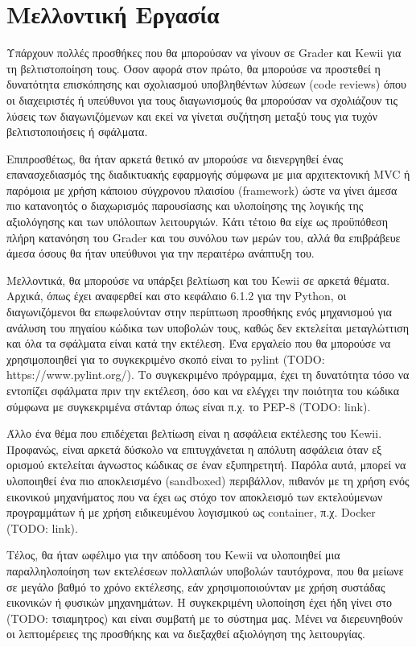 \documentclass[diploma]{softlab-thesis}
\begin{document}
\section{Μελλοντική Εργασία}

Υπάρχουν πολλές προσθήκες που θα μπορούσαν να γίνουν σε Grader και Kewii για τη
βελτιστοποίηση τους. Όσον αφορά στον πρώτο, θα μπορούσε να προστεθεί η δυνατότητα
επισκόπησης και σχολιασμού υποβληθέντων λύσεων (code reviews) όπου οι διαχειριστές
ή υπεύθυνοι για τους διαγωνισμούς θα μπορούσαν να σχολιάζουν τις λύσεις των
διαγωνιζόμενων και εκεί να γίνεται συζήτηση μεταξύ τους για τυχόν βελτιστοποιήσεις
ή σφάλματα.

\bigskip

Επιπροσθέτως, θα ήταν αρκετά θετικό αν μπορούσε να διενεργηθεί ένας επανασχεδιασμός
της διαδικτυακής εφαρμογής σύμφωνα με μια αρχιτεκτονική MVC ή παρόμοια με χρήση
κάποιου σύγχρονου πλαισίου (framework) ώστε να γίνει άμεσα πιο κατανοητός ο
διαχωρισμός παρουσίασης και υλοποίησης της λογικής της αξιολόγησης και των
υπόλοιπων λειτουργιών. Κάτι τέτοιο θα είχε ως προϋπόθεση πλήρη κατανόηση του Grader
και του συνόλου των μερών του, αλλά θα επιβράβευε άμεσα όσους θα ήταν υπεύθυνοι για
την περαιτέρω ανάπτυξη του.

\bigskip

Μελλοντικά, θα μπορούσε να υπάρξει βελτίωση και του Kewii σε αρκετά θέματα.
Αρχικά, όπως έχει αναφερθεί και στο κεφάλαιο 6.1.2 για την Python, οι
διαγωνιζόμενοι θα επωφελούνταν στην περίπτωση προσθήκης ενός μηχανισμού για
ανάλυση του πηγαίου κώδικα των υποβολών τους, καθώς δεν εκτελείται μεταγλώττιση
και όλα τα σφάλματα είναι κατά την εκτέλεση. Ένα εργαλείο που θα μπορούσε να
χρησιμοποιηθεί για το συγκεκριμένο σκοπό είναι το pylint (TODO:
https://www.pylint.org/). Το συγκεκριμένο πρόγραμμα, έχει τη δυνατότητα τόσο να
εντοπίζει σφάλματα πριν την εκτέλεση, όσο και να ελέγχει την ποιότητα του
κώδικα σύμφωνα με συγκεκριμένα στάνταρ όπως είναι π.χ. το PEP-8 (TODO: link).

\bigskip

Άλλο ένα θέμα που επιδέχεται βελτίωση είναι η ασφάλεια εκτέλεσης του Kewii.
Προφανώς, είναι αρκετά δύσκολο να επιτυγχάνεται η απόλυτη ασφάλεια όταν εξ ορισμού
εκτελείται άγνωστος κώδικας σε έναν εξυπηρετητή. Παρόλα αυτά, μπορεί να υλοποιηθεί
ένα πιο αποκλεισμένο (sandboxed) περιβάλλον, πιθανόν με τη χρήση ενός εικονικού
μηχανήματος που να έχει ως στόχο τον αποκλεισμό των εκτελούμενων προγραμμάτων ή
με χρήση ειδικευμένου λογισμικού ως container, π.χ. Docker (TODO: link).

\bigskip

Τέλος, θα ήταν ωφέλιμο για την απόδοση του Kewii να υλοποιηθεί μια παραλληλοποίηση
των εκτελέσεων πολλαπλών υποβολών ταυτόχρονα, που θα μείωνε σε μεγάλο βαθμό το
χρόνο εκτέλεσης, εάν χρησιμοποιούνταν με χρήση συστάδας εικονικών ή φυσικών
μηχανημάτων. Η συγκεκριμένη υλοποίηση έχει ήδη γίνει στο (TODO: τσιαμητρος) και
είναι συμβατή με το σύστημα μας. Μένει να διερευνηθούν οι λεπτομέρειες της
προσθήκης και να διεξαχθεί αξιολόγηση της λειτουργίας.




\end{document}
